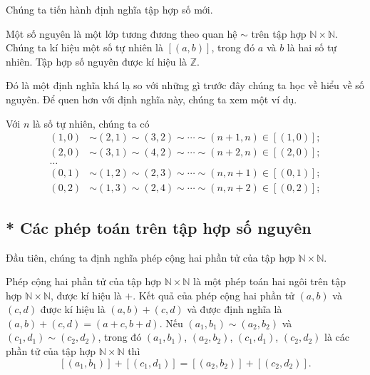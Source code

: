Chúng ta tiến hành định nghĩa tập hợp số mới.
\begin{definition}
    Một số nguyên là một lớp tương đương theo quan hệ $\sim$ trên tập hợp $\mathbb{N}\times\mathbb{N}$. Chúng ta kí hiệu một số tự nhiên là $[(a, b)]$, trong đó $a$ và $b$ là hai số tự nhiên. Tập hợp số nguyên được kí hiệu là $\mathbb{Z}$.
\end{definition}

Đó là một định nghĩa khá lạ so với những gì trước đây chúng ta học về hiểu về số nguyên. Để quen hơn với định nghĩa này, chúng ta xem một ví dụ.
\begin{example}
    Với $n$ là số tự nhiên, chúng ta có
    \begin{align*}
        (1, 0) & \sim (2, 1) \sim (3, 2) \sim \cdots \sim (n+1, n) \in [(1, 0)]; \\
        (2, 0) & \sim (3, 1) \sim (4, 2) \sim \cdots \sim (n+2, n) \in [(2, 0)]; \\
        \ldots                                                                   \\
        (0, 1) & \sim (1, 2) \sim (2, 3) \sim \cdots \sim (n, n+1) \in [(0, 1)]; \\
        (0, 2) & \sim (1, 3) \sim (2, 4) \sim \cdots \sim (n, n+2) \in [(0, 2)];
    \end{align*}
\end{example}

\subsection{* Các phép toán trên tập hợp số nguyên}

Đầu tiên, chúng ta định nghĩa phép cộng hai phần tử của tập hợp $\mathbb{N}\times\mathbb{N}$.
\begin{proposition}
    Phép cộng hai phần tử của tập hợp $\mathbb{N}\times\mathbb{N}$ là một phép toán hai ngôi trên tập hợp $\mathbb{N}\times\mathbb{N}$, được kí hiệu là $+$. Kết quả của phép cộng hai phần tử $(a, b)$ và $(c, d)$ được kí hiệu là $(a, b) + (c, d)$ và được định nghĩa là $(a, b) + (c, d) = (a+c, b+d)$. Nếu $(a_{1}, b_{1}) \sim (a_{2}, b_{2})$ và $(c_{1}, d_{1})\sim (c_{2}, d_{2})$, trong đó $(a_{1}, b_{1})$, $(a_{2}, b_{2})$, $(c_{1}, d_{1})$, $(c_{2}, d_{2})$ là các phần tử của tập hợp $\mathbb{N}\times\mathbb{N}$ thì
    \[
        [(a_{1}, b_{1})] + [(c_{1}, d_{1})] = [(a_{2}, b_{2})] + [(c_{2}, d_{2})].
    \]
\end{proposition}

